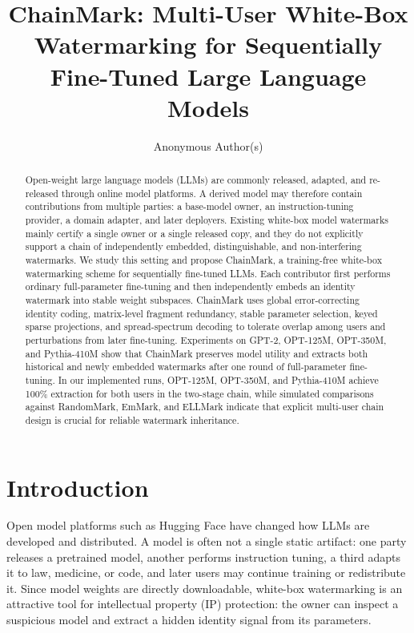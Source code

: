 \documentclass[sigconf]{acmart}
\newcommand{\method}{ChainMark}
\begin{document}
\title{ChainMark: Multi-User White-Box Watermarking for Sequentially Fine-Tuned Large Language Models}

\author{Anonymous Author(s)}
\renewcommand{\shortauthors}{Anonymous Author(s)}

\begin{abstract}
Open-weight large language models (LLMs) are commonly released, adapted, and re-released through online model platforms. A derived model may therefore contain contributions from multiple parties: a base-model owner, an instruction-tuning provider, a domain adapter, and later deployers. Existing white-box model watermarks mainly certify a single owner or a single released copy, and they do not explicitly support a chain of independently embedded, distinguishable, and non-interfering watermarks. We study this setting and propose \method, a training-free white-box watermarking scheme for sequentially fine-tuned LLMs. Each contributor first performs ordinary full-parameter fine-tuning and then independently embeds an identity watermark into stable weight subspaces. \method{} uses global error-correcting identity coding, matrix-level fragment redundancy, stable parameter selection, keyed sparse projections, and spread-spectrum decoding to tolerate overlap among users and perturbations from later fine-tuning. Experiments on GPT-2, OPT-125M, OPT-350M, and Pythia-410M show that \method{} preserves model utility and extracts both historical and newly embedded watermarks after one round of full-parameter fine-tuning. In our implemented runs, OPT-125M, OPT-350M, and Pythia-410M achieve 100\% extraction for both users in the two-stage chain, while simulated comparisons against RandomMark, EmMark, and ELLMark indicate that explicit multi-user chain design is crucial for reliable watermark inheritance.
\end{abstract}


\maketitle

\section{Introduction}
Open model platforms such as Hugging Face have changed how LLMs are developed and distributed. A model is often not a single static artifact: one party releases a pretrained model, another performs instruction tuning, a third adapts it to law, medicine, or code, and later users may continue training or redistribute it. Since model weights are directly downloadable, white-box watermarking is an attractive tool for intellectual property (IP) protection: the owner can inspect a suspicious model and extract a hidden identity signal from its parameters.
\end{document}
